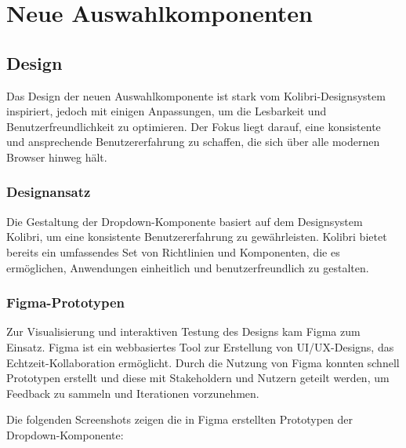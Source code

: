 \chapter{Neue Auswahlkomponenten}


\section{Design}

Das Design der neuen Auswahlkomponente ist stark vom Kolibri-Designsystem inspiriert, jedoch mit einigen Anpassungen, um die Lesbarkeit und Benutzerfreundlichkeit zu optimieren. 
Der Fokus liegt darauf, eine konsistente und ansprechende Benutzererfahrung zu schaffen, die sich über alle modernen Browser hinweg hält.


\subsection{Designansatz}

Die Gestaltung der Dropdown-Komponente basiert auf dem Designsystem Kolibri, um eine konsistente Benutzererfahrung zu gewährleisten. 
Kolibri bietet bereits ein umfassendes Set von Richtlinien und Komponenten, die es ermöglichen, Anwendungen einheitlich und benutzerfreundlich zu gestalten.




\clearpage
\subsection{Figma-Prototypen}

Zur Visualisierung und interaktiven Testung des Designs kam Figma zum Einsatz. 
Figma ist ein webbasiertes Tool zur Erstellung von UI/UX-Designs, das Echtzeit-Kollaboration ermöglicht. 
Durch die Nutzung von Figma konnten schnell Prototypen erstellt und diese mit Stakeholdern und Nutzern geteilt werden, um Feedback zu sammeln und Iterationen vorzunehmen.

Die folgenden Screenshots zeigen die in Figma erstellten Prototypen der Dropdown-Komponente:

